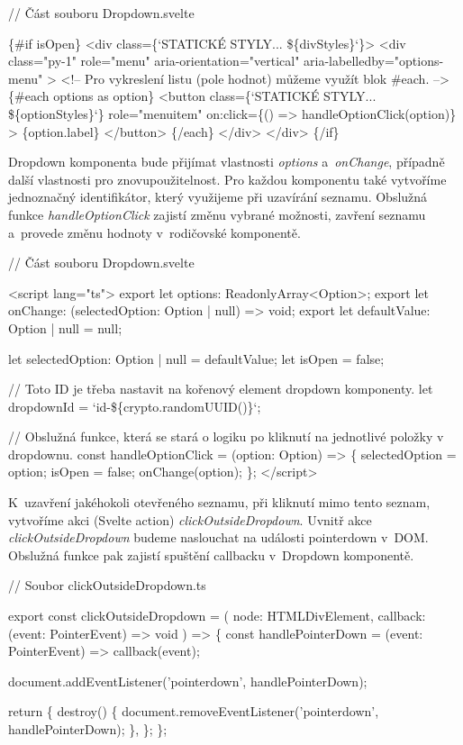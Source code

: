 \begin{prog}
// Část souboru Dropdown.svelte

\{#if isOpen\}
  <div class=\{`STATICKÉ STYLY... \$\{divStyles\}`\}>
    <div 
      class="py-1" role="menu" 
      aria-orientation="vertical" aria-labelledby="options-menu"
    >
      <!-- Pro vykreslení listu (pole hodnot) můžeme využít blok #each. -->
      \{#each options as option\}
        <button
          class=\{`STATICKÉ STYLY... \$\{optionStyles\}`\}
          role="menuitem"
          on:click=\{() => handleOptionClick(option)\}
        >
          \{option.label\}
        </button>
      \{/each\}
    </div>
  </div>
\{/if\}
\end{prog}

Dropdown komponenta bude přijímat vlastnosti \emph{options} a~\emph{onChange}, případně další vlastnosti pro znovupoužitelnost. Pro každou komponentu také vytvoříme jednoznačný identifikátor, který využijeme při uzavírání seznamu.
Obslužná funkce \emph{handleOptionClick} zajistí změnu vybrané možnosti, zavření seznamu a~provede změnu hodnoty v~rodičovské komponentě. 

\begin{prog}
// Část souboru Dropdown.svelte
  
<script lang="ts">
  export let options: ReadonlyArray<Option>;
  export let onChange: (selectedOption: Option | null) => void;
  export let defaultValue: Option | null = null;

  let selectedOption: Option | null = defaultValue;
  let isOpen = false;

  // Toto ID je třeba nastavit na kořenový element dropdown komponenty.
  let dropdownId = `id-\$\{crypto.randomUUID()\}`;

  // Obslužná funkce, která se stará o logiku 
    po kliknutí na jednotlivé položky v dropdownu.
  const handleOptionClick = (option: Option) => \{
    selectedOption = option;
    isOpen = false;
    onChange(option);
  \};
</script>
\end{prog}

K~uzavření jakéhokoli otevřeného seznamu, při kliknutí mimo tento seznam, vytvoříme akci (Svelte action) \emph{clickOutsideDropdown}. 
Uvnitř akce \emph{clickOutsideDropdown} budeme naslouchat na události pointerdown v~DOM. Obslužná funkce pak zajistí spuštění callbacku v~Dropdown komponentě.

\begin{prog}
// Soubor clickOutsideDropdown.ts

export const clickOutsideDropdown = (
  node: HTMLDivElement,
  callback: (event: PointerEvent) => void
) => \{
  const handlePointerDown = (event: PointerEvent) => callback(event);

  document.addEventListener('pointerdown', handlePointerDown);

  return \{
    destroy() \{
      document.removeEventListener('pointerdown', handlePointerDown);
    \},
  \};
\};
\end{prog}

